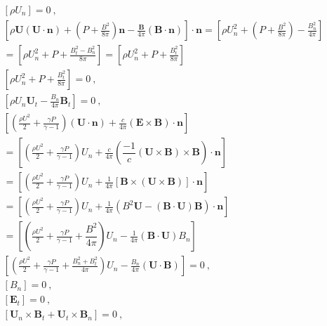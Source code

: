 \documentclass[12pt,a4paper]{article}
\renewcommand{\vec}[1]{\boldsymbol{#1}}
\begin{document}
\begin{eqnarray}
\left[\rho U_n \right] = 0 ~, \label{eq:mhd_per1} \\
\nonumber \boxed{\left[\rho \vec{U}(\vec{U}\cdot \vec{n}) + \left(P +\frac{B^2}{8\pi} \right) \vec{n} -\frac{\vec{B}}{4\pi} \left(\vec{B}\cdot \vec{n}\right) \right]\cdot \vec{n} = \left[\rho U_n^2 + \left(P +\frac{B^2}{8\pi} \right) -\frac{B_n^2}{4\pi} \right]} \\
\nonumber \boxed{=\left[\rho U_n^2 + P +\frac{B^2_t -B^2_n}{8\pi} \right] = \left[\rho U_n^2 + P +\frac{B^2_t}{8\pi} \right]} \\
\left[\rho U_n^2 +P +\frac{B_t^2}{8\pi} \right] = 0 ~,  \label{eq:mhd_per2} \\
\left[\rho U_n \vec{U}_t - \frac{B_n}{4\pi} \vec{B}_t \right] = 0 ~,  \label{eq:mhd_per3} \\
\nonumber \boxed{\left[\left(\frac{\rho U^2}{2} +\frac{\gamma P}{\gamma -1} \right) (\vec{U} \cdot \vec{n}) +\frac{c}{4\pi} (\vec{E} \times \vec{B}) \cdot \vec{n} \right] } \\
\nonumber \boxed{= \left[\left(\frac{\rho U^2}{2} +\frac{\gamma P}{\gamma -1} \right) U_n +\frac{c}{4\pi} \left(\dfrac{-1}{c}(\vec{U} \times \vec{B} ) \times \vec{B} \right) \cdot \vec{n} \right] } \\
\nonumber \boxed{= \left[\left(\frac{\rho U^2}{2} +\frac{\gamma P}{\gamma -1} \right) U_n +\frac{1}{4\pi} \left[\vec{B} \times (\vec{U} \times \vec{B} ) \right] \cdot \vec{n} \right] } \\
\nonumber \boxed{= \left[\left(\frac{\rho U^2}{2} +\frac{\gamma P}{\gamma -1} \right) U_n +\frac{1}{4\pi} \left(B^2 \vec{U} -(\vec{B}\cdot \vec{U}) \vec{B}  \right) \cdot \vec{n} \right] } \\
\nonumber \boxed{= \left[\left(\frac{\rho U^2}{2} +\frac{\gamma P}{\gamma -1} +\dfrac{B^2}{4\pi } \right) U_n -\frac{1}{4\pi}(\vec{B}\cdot \vec{U}) B_n \right] } \\
\left[\left(\frac{\rho U^2}{2} +\frac{\gamma P}{\gamma-1} +\frac{B_n^2 +B_t^2}{4\pi} \right)U_n -\frac{B_n}{4\pi} (\vec{U} \cdot \vec{B}) \right] = 0 ~,  \label{eq:mhd_per4} \\
\left[B_n \right] = 0 ~,  \label{eq:mhd_per5} \\
\left[\vec{E}_t \right] = 0 ~,  \label{eq:mhd_per6} \\
\left[ \vec{U}_n\times \vec{B}_t +\vec{U}_t \times \vec{B}_n \right] = 0 ~,  \label{eq:mhd_per7}
\end{eqnarray}
\end{document}
